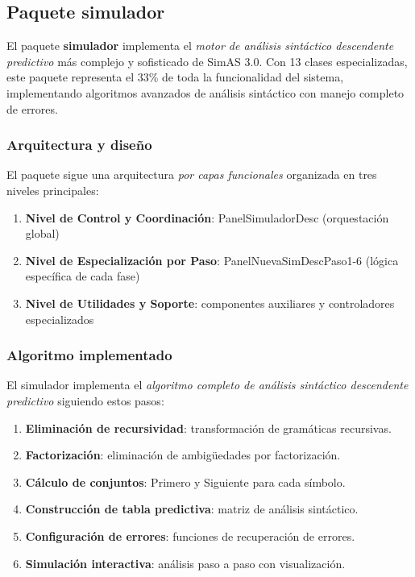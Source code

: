 \subsection{Paquete simulador}

El paquete \textbf{simulador} implementa el \textit{motor de análisis sintáctico descendente predictivo} más complejo y sofisticado de SimAS 3.0. Con 13 clases especializadas, este paquete representa el 33\% de toda la funcionalidad del sistema, implementando algoritmos avanzados de análisis sintáctico con manejo completo de errores.

\subsubsection{Arquitectura y diseño}

El paquete sigue una arquitectura \textit{por capas funcionales} organizada en tres niveles principales:

\begin{enumerate}
    \item \textbf{Nivel de Control y Coordinación}: PanelSimuladorDesc (orquestación global)
    \item \textbf{Nivel de Especialización por Paso}: PanelNuevaSimDescPaso1-6 (lógica específica de cada fase)
    \item \textbf{Nivel de Utilidades y Soporte}: componentes auxiliares y controladores especializados
\end{enumerate}

\subsubsection{Algoritmo implementado}

El simulador implementa el \textit{algoritmo completo de análisis sintáctico descendente predictivo} siguiendo estos pasos:

\begin{enumerate}
    \item \textbf{Eliminación de recursividad}: transformación de gramáticas recursivas.
    \item \textbf{Factorización}: eliminación de ambigüedades por factorización.
    \item \textbf{Cálculo de conjuntos}: Primero y Siguiente para cada símbolo.
    \item \textbf{Construcción de tabla predictiva}: matriz de análisis sintáctico.
    \item \textbf{Configuración de errores}: funciones de recuperación de errores.
    \item \textbf{Simulación interactiva}: análisis paso a paso con visualización.
\end{enumerate}

